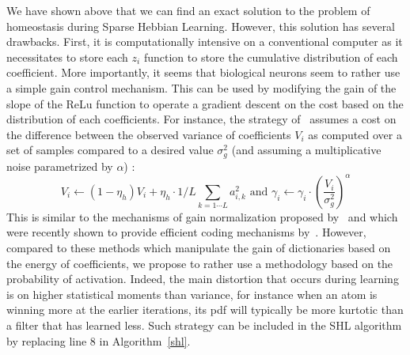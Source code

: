 \documentclass[draft]{article} %
\newcommand{\seeFig}[1]{Figure~\ref{fig:#1}}%
\begin{document}
We have shown above that we can find an exact solution to the problem of homeostasis during Sparse Hebbian Learning. However, this solution has several drawbacks. First, it is computationally intensive on a conventional computer as it necessitates to store each $z_i$ function to store the cumulative distribution of each coefficient. More importantly, it seems that biological neurons seem to rather use a simple gain control mechanism. This can be used by modifying the gain of the slope of the ReLu function to operate a gradient descent on the cost based on the distribution of each coefficients. For instance, the strategy of~\citep{Olshausen97} assumes a cost on the difference between the observed variance of coefficients $V_i$ as computed over a set of samples compared to a desired value $\sigma_g^2$ (and assuming a multiplicative noise parametrized by $\alpha$) :
\begin{equation}%
V_i \leftarrow (1- \eta_h ) V_i + \eta_h \cdot 1/L\sum_{k=1\cdots L} a_{i, k}^2 \textrm{ and }
\gamma_i \leftarrow \gamma_i \cdot \left( \frac{V_i}{\sigma_g^2} \right)^\alpha
\end{equation}%
This is similar to the mechanisms of gain normalization proposed by~\citep{Schwartz01} and which were recently shown to provide efficient coding mechanisms by~\citep{Simoncelli17}. However, compared to these methods which manipulate the gain of dictionaries based on the energy of coefficients, we propose to rather use a methodology based on the probability of activation. Indeed, the main distortion that occurs during learning is on higher statistical moments than variance, for instance when an atom is winning more at the earlier iterations, its pdf will typically be more kurtotic than a filter that has learned less. Such strategy can be included in the SHL algorithm by replacing line 8 in Algorithm~\ref{shl}.
\end{document}
